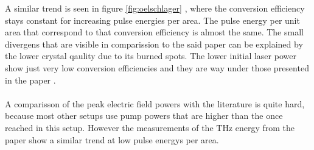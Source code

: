 A similar trend is seen in figure \ref{fig:oelschlager} \cite{THZ_eltric_field}, where the conversion efficiency stays constant for increasing pulse energies per area.
The pulse energy per unit area that correspond to that conversion efficiency is almost the same.
The small divergens that are visible in comparission to the said paper can be explained by the lower crystal qaulity due to its burned spots.
The lower initial laser power show just very low conversion efficiencies and they are way under those presented in the paper \cite{THZ_electric_fields}.
\\\\
A comparisson of the peak electric field powers with the literature is quite hard, because most other setups use pump powers that are higher than the once reached in this setup.
However the measurements of the $\si{\tera\hertz}$ energy from the paper \cite[5]{THZ_eltric_field} show a similar trend at low pulse energys per area.
\\
\FloatBarrier
